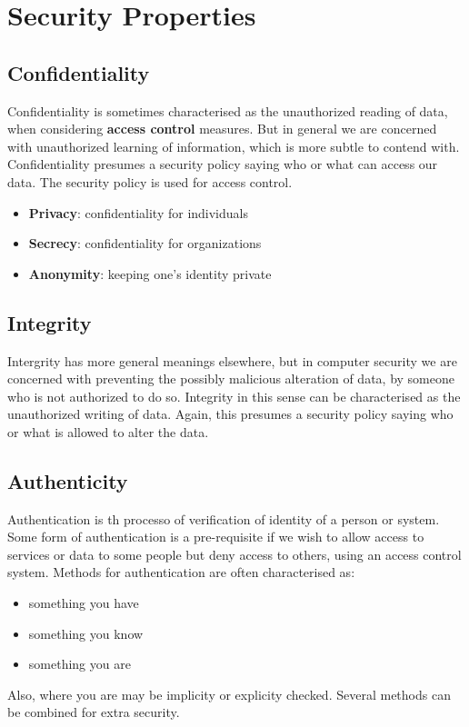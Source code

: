 \documentclass[12pt, a4paper]{report}
\begin{document}
\section{Security Properties}
\subsection{Confidentiality}
Confidentiality is sometimes characterised as the unauthorized reading of data, when considering \textbf{access control} measures. But in general we are concerned with unauthorized learning of information, which is more subtle to contend with. Confidentiality presumes a security policy saying who or what can access our data. The security policy is used for access control.
\begin{itemize}
    \item \textbf{Privacy}: confidentiality for individuals
    \item \textbf{Secrecy}: confidentiality for organizations
    \item \textbf{Anonymity}: keeping one's identity private
\end{itemize}
\subsection{Integrity}
Intergrity has more general meanings elsewhere, but in computer security we are concerned with preventing the possibly malicious alteration of data, by someone who is not authorized to do so. Integrity in this sense can be characterised as the unauthorized writing of data. Again, this presumes a security policy saying who or what is allowed to alter the data.
\subsection{Authenticity}
Authentication is th processo of verification of identity of a person or system. Some form of authentication is a pre-requisite if we wish to allow access to services or data to some people but deny access to others, using an access control system. Methods for authentication are often characterised as:
\begin{itemize}
    \item something you have
    \item something you know
    \item something you are
\end{itemize}
Also, where you are may be implicity or explicity checked. Several methods can be combined for extra security.
\end{document}
